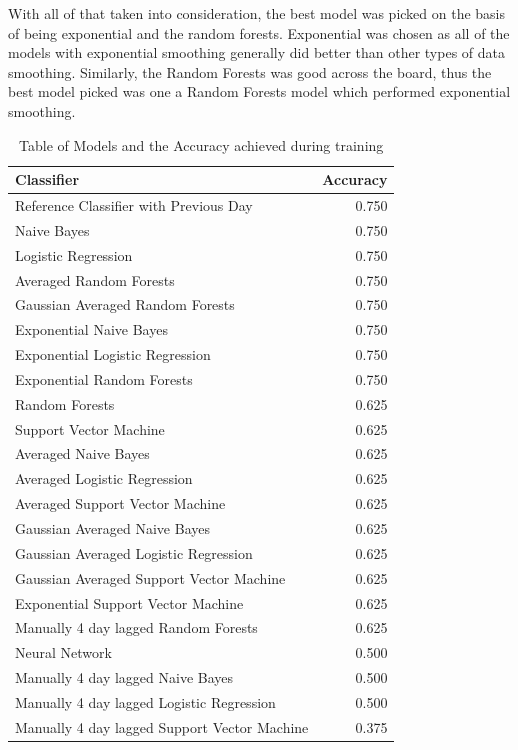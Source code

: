 With all of that taken into consideration, the best model was picked on the basis of being exponential and the random forests. Exponential was chosen as all of the models with exponential smoothing generally did better than other types of data smoothing. Similarly, the Random Forests was good across the board, thus the best model picked was one a Random Forests model which performed exponential smoothing.
\begin{table}[H]
	\centering 
\begin{tabular}{lr}

	Classifier &  Accuracy \\
	\hline
	Reference Classifier with Previous Day & 0.750\\
	\hline
                                  Naive Bayes &     0.750 \\
Logistic Regression &     0.750 \\
Averaged Random Forests &     0.750 \\
Gaussian Averaged Random Forests &     0.750 \\
Exponential Naive Bayes &     0.750 \\
Exponential Logistic Regression &     0.750 \\
Exponential Random Forests &     0.750 \\
Random Forests &     0.625 \\
Support Vector Machine &     0.625 \\
Averaged Naive Bayes &     0.625 \\
Averaged Logistic Regression &     0.625 \\
Averaged Support Vector Machine &     0.625 \\
Gaussian Averaged Naive Bayes &     0.625 \\
Gaussian Averaged Logistic Regression &     0.625 \\
Gaussian Averaged Support Vector Machine &     0.625 \\
Exponential Support Vector Machine &     0.625 \\
Manually 4 day lagged Random Forests &     0.625 \\
Neural Network & 0.500 \\
Manually 4 day lagged Naive Bayes &     0.500 \\
Manually 4 day lagged Logistic Regression &     0.500 \\
Manually 4 day lagged Support Vector Machine &     0.375 \\
	

\end{tabular}

	\caption{Table of Models and the Accuracy achieved during training}
		\label{table:modaccuracy}
\end{table}
